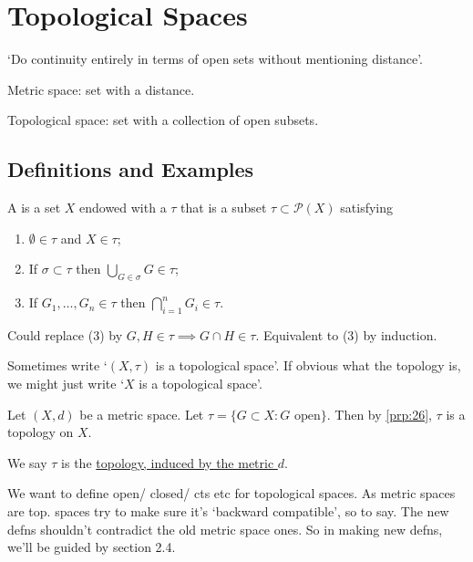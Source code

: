\section{Topological Spaces}

`Do continuity entirely in terms of open sets without mentioning distance'.

Metric space: set with a distance.

Topological space: set with a collection of open subsets.

\subsection{Definitions and Examples}

\begin{definition}
    A  is a set $X$ endowed with a  $\tau$ that is a subset $\tau \subset \mathcal{P}(X)$ satisfying
    \begin{enumerate}
        \item $\emptyset \in \tau$ and $X \in \tau$;
        \item If $\sigma \subset \tau$ then $\bigcup_{G \in \sigma} G \in \tau$;
        \item If $G_1, \dots, G_n \in \tau$ then $\bigcap_{i = 1}^n G_i \in \tau$.
    \end{enumerate}
\end{definition}

\begin{remark}
    Could replace (3) by $G, H \in \tau \implies G \cap H \in \tau$.
    Equivalent to (3) by induction.
\end{remark}

\begin{notation}
    Sometimes write `$(X, \tau)$ is a topological space'.
    If obvious what the topology is, we might just write `$X$ is a topological space'.
\end{notation}

\begin{example}
    Let $(X, d)$ be a metric space.
    Let $\tau = \{G \subset X : G \text{ open}\}$.
    Then by \cref{prp:26}, $\tau$ is a topology on $X$.

    We say $\tau$ is the \underline{topology, induced by the metric $d$}.
\end{example}

We want to define open/ closed/ cts etc for topological spaces.
As metric spaces are top. spaces try to make sure it's `backward compatible', so to say.
The new defns shouldn't contradict the old metric space ones.
So in making new defns, we'll be guided by section 2.4.

